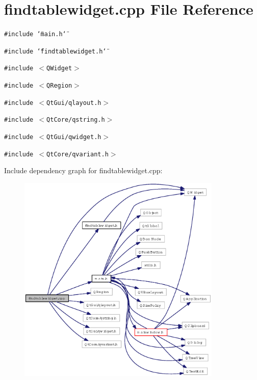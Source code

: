 \section{findtablewidget.cpp File Reference}
\label{findtablewidget_8cpp}
{\tt \#include \char`\"{}main.h\char`\"{}}\par
{\tt \#include \char`\"{}findtablewidget.h\char`\"{}}\par
{\tt \#include $<$QWidget$>$}\par
{\tt \#include $<$QRegion$>$}\par
{\tt \#include $<$Qt\-Gui/qlayout.h$>$}\par
{\tt \#include $<$Qt\-Core/qstring.h$>$}\par
{\tt \#include $<$Qt\-Gui/qwidget.h$>$}\par
{\tt \#include $<$Qt\-Core/qvariant.h$>$}\par


Include dependency graph for findtablewidget.cpp:\begin{figure}[H]
\begin{center}
\leavevmode
\includegraphics[width=275pt]{findtablewidget_8cpp__incl}
\end{center}
\end{figure}
